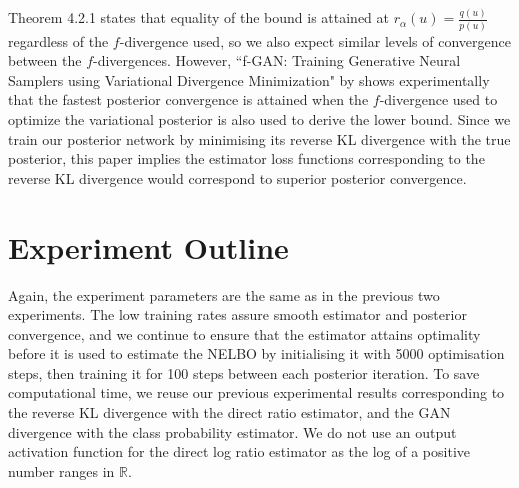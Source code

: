 \documentclass[honours,12pt]{unswthesis}
\newcommand{\R}{\mathbb{R}}
\numberwithin{equation}{section}
\theoremstyle{definition}
\begin{document}
Theorem 4.2.1 states that equality of the bound is attained at $r_\alpha(u)=\frac{q(u)}{p(u)}$ regardless of the $f$-divergence used, so we also expect similar levels of convergence between the $f$-divergences. However, ``f-GAN: Training Generative Neural Samplers using Variational Divergence Minimization" by \citet{nowozin} shows experimentally that the fastest posterior convergence is attained when the $f$-divergence used to optimize the variational posterior is also used to derive the lower bound. Since we train our posterior network by minimising its reverse KL divergence with the true posterior, this paper implies the estimator loss functions corresponding to the reverse KL divergence would correspond to superior posterior convergence.
\section{Experiment Outline}
Again, the experiment parameters are the same as in the previous two experiments. The low training rates assure smooth estimator and posterior convergence, and we continue to ensure that the estimator attains optimality before it is used to estimate the NELBO by initialising it with 5000 optimisation steps, then training it for 100 steps between each posterior iteration. To save computational time, we reuse our previous experimental results corresponding to the reverse KL divergence with the direct ratio estimator, and the GAN divergence with the class probability estimator. We do not use an output activation function for the direct log ratio estimator as the log of a positive number ranges in $\R$.
\end{document}
